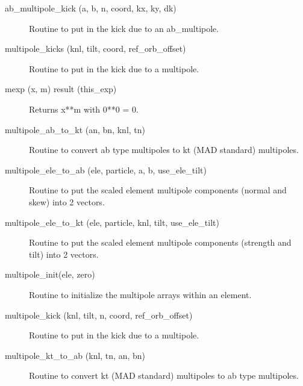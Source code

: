 \begin{description}

\label{r:ab.multipole.kick}
\item[ab_multipole_kick (a, b, n, coord, kx, ky, dk)] \Newline 
Routine to put in the kick due to an ab_multipole.

\label{r:multipole.kicks}
\item[multipole_kicks (knl, tilt, coord, ref_orb_offset)] \Newline 
Routine to put in the kick due to a multipole.

\label{r:mexp}
\item[mexp (x, m) result (this_exp)] \Newline 
Returns x**m with 0**0 = 0.

\label{r:multipole.ab.to.kt}
\item[multipole_ab_to_kt (an, bn, knl, tn)] \Newline
Routine to convert ab type multipoles to kt (MAD standard) multipoles. 

\label{r:multipole.ele.to.ab}
\item[multipole_ele_to_ab (ele, particle, a, b, use_ele_tilt)] \Newline
Routine to put the scaled element multipole components (normal and skew) into 2 vectors. 

\label{r:multipole.ele.to.kt}
\item[multipole_ele_to_kt (ele, particle, knl, tilt, use_ele_tilt)] \Newline
Routine to put the scaled element multipole components (strength and tilt) 
into 2 vectors. 

\label{r:multipole.init}
\item[multipole_init(ele, zero)] \Newline
Routine to initialize the multipole arrays within an element.

\label{r:multipole.kick}
\item[multipole_kick (knl, tilt, n, coord, ref_orb_offset)] \Newline
Routine to put in the kick due to a multipole. 

\label{r:multipole.kt.to.ab}
\item[multipole_kt_to_ab (knl, tn, an, bn)] \Newline
Routine to convert kt (MAD standard) multipoles to ab type multipoles. 

\end{description}

